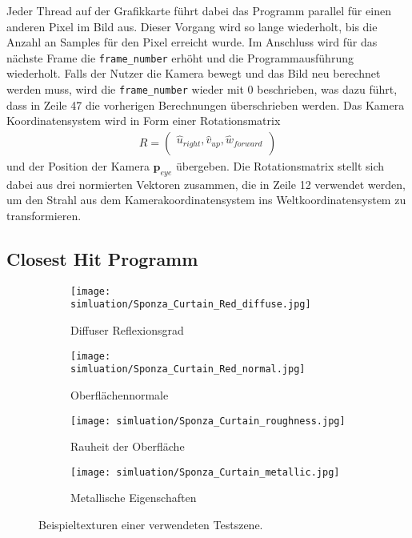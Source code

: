 \documentclass[thesis.tex]{subfiles}
\begin{document}
%
Jeder Thread auf der Grafikkarte führt dabei das Programm parallel für einen anderen Pixel im Bild aus. Dieser Vorgang wird so lange wiederholt, bis die Anzahl an Samples für den Pixel erreicht wurde. Im Anschluss wird für das nächste Frame die \texttt{frame\_number} erhöht und die Programmausführung wiederholt. Falls der Nutzer die Kamera bewegt und das Bild neu berechnet werden muss, wird die \texttt{frame\_number} wieder mit 0 beschrieben, was dazu führt, dass in Zeile 47 die vorherigen Berechnungen überschrieben werden. Das Kamera Koordinatensystem wird in Form einer Rotationsmatrix \begin{equation}
\begin{aligned}
R = \begin{pmatrix}
   \hat u_{right}, \hat v_{up}, \hat w_{forward}\\
\end{pmatrix}
\end{aligned}
\end{equation} und der Position der Kamera $\mathbf{p}_{eye}$ übergeben. Die Rotationsmatrix stellt sich dabei aus drei normierten Vektoren zusammen, die in Zeile 12 verwendet werden, um den Strahl aus dem Kamerakoordinatensystem ins Weltkoordinatensystem zu transformieren. 

\subsection{Closest Hit Programm}\label{sec:closest_hit_program}

\begin{figure}[ht!]
\centering
\begin{subfigure}[b]{0.24\textwidth}
\texttt{[image: simluation/Sponza\_Curtain\_Red\_diffuse.jpg]}
\caption{Diffuser Reflexionsgrad}
\end{subfigure}
\begin{subfigure}[b]{0.24\textwidth}
\texttt{[image: simluation/Sponza\_Curtain\_Red\_normal.jpg]}
\caption{Oberflächennormale}
\end{subfigure}
\begin{subfigure}[b]{0.24\textwidth}
\texttt{[image: simluation/Sponza\_Curtain\_roughness.jpg]}
\caption{Rauheit der Oberfläche}
\end{subfigure}
\begin{subfigure}[b]{0.24\textwidth}
\texttt{[image: simluation/Sponza\_Curtain\_metallic.jpg]}
\caption{Metallische Eigenschaften}
\end{subfigure}
\caption{Beispieltexturen einer verwendeten Testszene.}
\label{fig:material_textures}
\end{figure}
\end{document}
